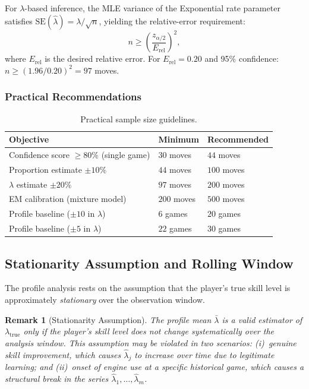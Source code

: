 \documentclass[11pt,a4paper]{article}
\newtheorem{remark}{Remark}
\begin{document}
For $\lambda$-based inference, the MLE variance of the Exponential rate
parameter satisfies $\text{SE}(\hat{\lambda}) = \lambda / \sqrt{n}$, yielding
the relative-error requirement:
\begin{equation}
    n \geq \left(\frac{z_{\alpha/2}}{E_{\text{rel}}}\right)^2,
    \label{eq:n_lambda}
\end{equation}
where $E_{\text{rel}}$ is the desired relative error. For $E_{\text{rel}} = 0.20$
and 95\% confidence: $n \geq (1.96/0.20)^2 = 97$ moves.

\subsubsection{Practical Recommendations}

\begin{table}[H]
\centering
\caption{Practical sample size guidelines.}
\label{tab:practical}
\begin{tabular}{lll}
\toprule
Objective & Minimum & Recommended \\
\midrule
Confidence score $\geq 80\%$ (single game) & $30$ moves & $44$ moves \\
Proportion estimate $\pm 10\%$ & $44$ moves & $100$ moves \\
$\lambda$ estimate $\pm 20\%$ & $97$ moves & $200$ moves \\
EM calibration (mixture model) & $200$ moves & $500$ moves \\
Profile baseline ($\pm 10$ in $\lambda$) & $6$ games & $20$ games \\
Profile baseline ($\pm 5$ in $\lambda$) & $22$ games & $30$ games \\
\bottomrule
\end{tabular}
\end{table}

\subsection{Stationarity Assumption and Rolling Window}

The profile analysis rests on the assumption that the player's true skill level
is approximately \emph{stationary} over the observation window.

\begin{remark}[Stationarity Assumption]
\label{rem:stationarity}
The profile mean $\bar{\lambda}$ is a valid estimator of $\lambda_{\text{true}}$
only if the player's skill level does not change systematically over the
analysis window. This assumption may be violated in two scenarios:
(i)~genuine skill improvement, which causes $\hat{\lambda}_j$ to increase
over time due to legitimate learning; and (ii)~onset of engine use at a
specific historical game, which causes a structural break in the series
$\hat{\lambda}_1, \ldots, \hat{\lambda}_m$.
\end{remark}
\end{document}
